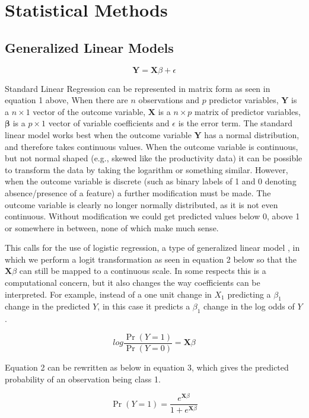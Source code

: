 \documentclass{article}
\newcommand{\bX}{\mathbf{X}}
\newcommand{\bY}{\mathbf{Y}}
\newcommand{\bbeta}{\mathbf{\beta}}
\begin{document}
\section{Statistical Methods} \label{stat_methods}

\subsection{Generalized Linear Models}

\[\bY = \bX\beta + \epsilon \tag{1}\]

Standard Linear Regression can be represented in matrix form as seen in equation 1 above, When there are $n$ observations and $p$ predictor variables,  $\bY$ is a $n \times 1$ vector of the outcome variable, $\bX$ is a $n \times p$ matrix of predictor variables, $\bbeta$ is a $p \times 1$ vector of variable coefficients and $\epsilon$ is the error 
term. The standard linear model works best when the outcome variable $\bY$ has a normal distribution, and therefore takes 
continuous values. When the outcome variable is continuous, but not normal shaped (e.g., skewed like the productivity 
data) it can be possible to transform the data by taking the logarithm or something similar. However, when the outcome 
variable is discrete (such as binary labels of 1 and 0 denoting absence/presence of a feature) a further modification must be made. The outcome variable is clearly no longer normally distributed, as it is not even continuous. Without modification we could get predicted values below 0, above 1 or somewhere in between, none of which make much sense.

This calls for the use of logistic regression, a type of generalized linear model \cite{dobson}, in which we perform a logit transformation as seen in equation 2 below so that the 
$\bX\beta$ can still be mapped to a continuous scale. In some respects this is a computational concern, but it also changes the 
way coefficients can be interpreted. For example, instead of a one unit change in $X_1$ predicting a $\beta_1$ change in the predicted $Y$, 
in this case it predicts a $\beta_1$ change in the log odds of $Y$.

\[log \frac{\Pr(Y = 1)}{\Pr(Y = 0)} = \bX\beta \tag{2}\]

Equation 2 can be rewritten as below in equation 3, which gives the predicted probability of an observation being class 1.

\[ \Pr(Y = 1) = \frac{e^{\bX\beta}}{1 + e^{\bX\beta}} \tag{3}\]
\end{document}
